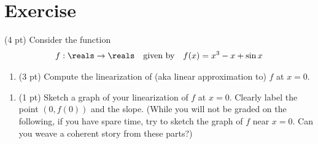 %
%
%
%

\section{Exercise}


(4 pt) Consider the function
\begin{align*}
f : \reals \rightarrow \reals
&&
\text{given by}
&&
f(x)
=
x^{3} - x + \sin x
\end{align*}
\begin{enumerate}[label=(\alph*)]
\item\label{itm : LQ06 Linearization} (3 pt) Compute the linearization of (aka linear approximation to) $f$ at $x = 0$.
\end{enumerate}




\begin{enumerate}[resume,label=(\alph*)]
\item\label{itm : LQ06 Graph} (1 pt) Sketch a graph of your linearization of $f$ at $x = 0$. Clearly label the point $(0,f(0))$ and the slope. (While you will not be graded on the following, if you have spare time, try to sketch the graph of $f$ near $x = 0$. Can you weave a coherent story from these parts?)
\end{enumerate}

